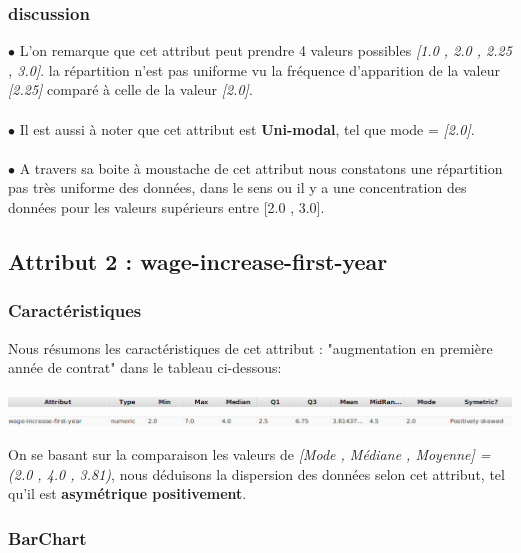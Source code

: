 \documentclass[12pt,a4paper,oneside]{book}
\begin{document}
\subsubsection{discussion}
$\bullet $ L'on remarque que cet attribut peut prendre 4 valeurs possibles \textit{[1.0 , 2.0 , 2.25 , 3.0]}. la répartition n'est pas uniforme vu la fréquence d'apparition de la valeur \textit{[2.25]} comparé à celle de la valeur \textit{[2.0]}.\\
\textbf{ }\\
$\bullet $ Il est aussi à noter que cet attribut est \textbf{Uni-modal}, tel que mode = \textit{[2.0]}.\\
\textbf{ }\\
$\bullet $ A travers sa boite à moustache de cet attribut nous constatons une répartition pas très uniforme des données, dans le sens ou il y a une concentration des données pour les valeurs supérieurs entre [2.0 , 3.0].


\newpage


\subsection{Attribut 2 : wage-increase-first-year }
\subsubsection{Caractéristiques}
Nous résumons les caractéristiques de cet attribut : "augmentation en première année de contrat" dans le tableau ci-dessous:
\begin{center}
	\includegraphics[width=1\textwidth]{screens/att.png}\\
	\includegraphics[width=1\textwidth]{screens/att-2.png}%
	\label{labelname}%
\end{center}

On se basant sur la comparaison les valeurs de \textit{[Mode , Médiane , Moyenne] = (2.0 , 4.0 , 3.81)}, nous déduisons la dispersion des données selon cet attribut, tel qu'il est \textbf{asymétrique positivement}.

\subsubsection{BarChart}
\end{document}
